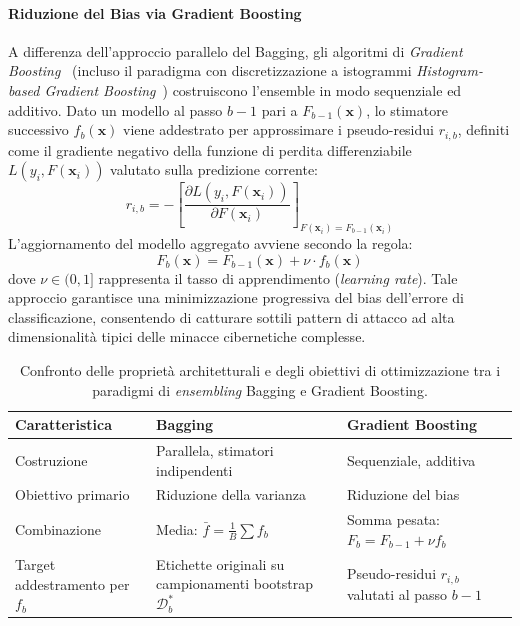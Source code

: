 \paragraph{Riduzione del Bias via Gradient Boosting}
A differenza dell'approccio parallelo del Bagging, gli algoritmi di \textit{Gradient Boosting}~\cite{friedman2001} (incluso il paradigma con discretizzazione a istogrammi \textit{Histogram-based Gradient Boosting}~\cite{ke2017}) costruiscono l'ensemble in modo sequenziale ed additivo. Dato un modello al passo $b-1$ pari a $F_{b-1}(\mathbf{x})$, lo stimatore successivo $f_b(\mathbf{x})$ viene addestrato per approssimare i pseudo-residui $r_{i,b}$, definiti come il gradiente negativo della funzione di perdita differenziabile $L(y_i, F(\mathbf{x}_i))$ valutato sulla predizione corrente:
\begin{equation}
    r_{i,b} = -\left[ \frac{\partial L(y_i, F(\mathbf{x}_i))}{\partial F(\mathbf{x}_i)} \right]_{F(\mathbf{x}_i) = F_{b-1}(\mathbf{x}_i)}
\end{equation}
L'aggiornamento del modello aggregato avviene secondo la regola:
\begin{equation}
    F_b(\mathbf{x}) = F_{b-1}(\mathbf{x}) + \nu \cdot f_b(\mathbf{x})
\end{equation}
dove $\nu \in (0, 1]$ rappresenta il tasso di apprendimento (\textit{learning rate}). Tale approccio garantisce una minimizzazione progressiva del bias dell'errore di classificazione, consentendo di catturare sottili pattern di attacco ad alta dimensionalità tipici delle minacce cibernetiche complesse.

\begin{table}[H]
\centering
\caption{Confronto delle proprietà architetturali e degli obiettivi di ottimizzazione tra i paradigmi di \textit{ensembling} Bagging e Gradient Boosting.}
\label{tab:bagging_vs_boosting}
\begin{tabularx}{\textwidth}{>{\raggedright\arraybackslash}p{4cm} >{\raggedright\arraybackslash}X >{\raggedright\arraybackslash}X }
\toprule
\textbf{Caratteristica} & \textbf{Bagging} & \textbf{Gradient Boosting} \\
\midrule
Costruzione & Parallela, stimatori indipendenti & Sequenziale, additiva \\
\addlinespace
Obiettivo primario & Riduzione della varianza & Riduzione del bias \\
\addlinespace
Combinazione & Media: $\bar{f} = \frac{1}{B}\sum f_b$ & Somma pesata: $F_b = F_{b-1} + \nu f_b$ \\
\addlinespace
Target addestramento per $f_b$ & Etichette originali su campionamenti bootstrap $\mathcal{D}_b^*$ & Pseudo-residui $r_{i,b}$ valutati al passo $b-1$ \\
\bottomrule
\end{tabularx}
\end{table}

